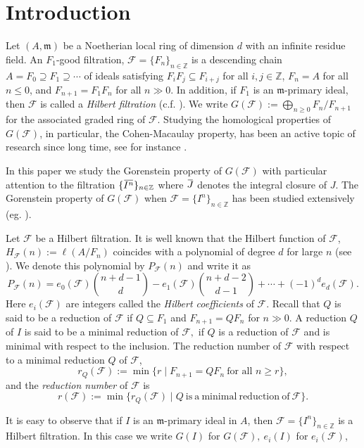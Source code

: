 \documentclass[12pt]{amsart}
\theoremstyle{definition}
\theoremstyle{remark}
\numberwithin{equation}{section}
\newcommand{\m}{{\mathfrak m}}
\newcommand{\FF}{\mathcal{F}}
\newcommand{\ol}[1]{\mkern 1.5mu\overline{\mkern-1.5mu#1\mkern-1.5mu}\mkern 1.5mu} %
\begin{document}
\section{Introduction}
Let $(A,\m)$ be a Noetherian local ring of dimension $d$ 
with an infinite residue field. 
An $F_1$-good filtration, $\FF = \{F_n\}_{n\in \mathbb{Z}}$ 
is a descending chain $A=F_0 \supseteq F_1 \supseteq \cdots $ 
of ideals satisfying  $F_i F_j \subseteq F_{i+j}$ for all $i,j \in \mathbb{Z}$,  $F_n = A$ for all $n \leq 0$, and $F_{n+1} =F_1F_n$ for all $n \gg 0$. 
In addition, if $F_1$ is an $\m$-primary ideal, 
then $\FF$ is called a {\it Hilbert filtration} (c.f. \cite{Bla97}). 
We write ${G}(\FF):=\bigoplus_{n \ge 0} {F_n}/{F_{n+1}}$ 
for the associated graded ring of $\FF.$
Studying the homological properties of $G(\FF)$, 
in particular, the Cohen-Macaulay property, has been an active topic 
of research since long time, 
see for instance \cite{GN94,Hun87,Lip94}.
\par 
In this paper we study the Gorenstein property of $G(\FF)$ 
with particular attention to the filtration 
$\{\ol{I^n}\}_{n \in \mathbb{Z}}$ where $\ol{J}$ denotes 
the integral closure of $J$. 
The Gorenstein property of $G(\FF)$ when 
$\FF=\{I^n\}_{n \in \mathbb{Z}}$ has been studied extensively 
(eg. \cite{Ooishi, Hyry, GI, JV95, Sally1983, sa, S1}).
\par 
Let $\FF$ be a Hilbert filtration.
It is well known that the Hilbert function of $\FF$, 
$H_{\FF}(n):=\ell(A/F_n)$ coincides with a polynomial 
of degree $d$ for large $n$ (see \cite{Mar89}). 
We denote this polynomial by $P_{\FF}(n)$ and write it as
\[
P_{\FF}(n)=e_0(\FF)\binom{n+d-1}{d}-e_1(\FF)\binom{n+d-2}{d-1}
+\cdots +(-1)^de_d(\FF).
\]
Here $e_i(\FF)$ are integers called the {\it Hilbert coefficients} of $\FF$. 
Recall that $Q$ is said to be a reduction of $\FF$ 
if  $Q\subseteq F_1$ and  $F_{n+1}=QF_n$ for $n\gg0$. 
A reduction $Q$ of $I$ is said to be a minimal reduction 
of $\FF,$ if $Q$ is a reduction of $\FF$ and is minimal 
with respect to the inclusion. 
The reduction number of $\FF$ with respect to a minimal reduction 
$Q$ of $\FF$, 
\[
r_Q(\mathcal{F}):=\min\{r\mid F_{n+1}=QF_n ~\textrm{for all } n\geq r \},
\]
and the {\it reduction number} of $\FF$ is 
\[
r(\FF) :=  \min\{r_Q(\FF) 
\mid Q ~\mathrm{is ~a ~minimal ~reduction ~of} ~\FF \}.
\]
\par 
It is easy to observe that if $I$ is an $\m$-primary ideal in $A$, 
then $\FF=\{I^n\}_{n \in \mathbb{Z}}$ is a Hilbert filtration. 
In this case we write ${G}(I)$ for $G(\FF),~{e}_i(I)$ for $e_i(\FF)$, 
\end{document}
